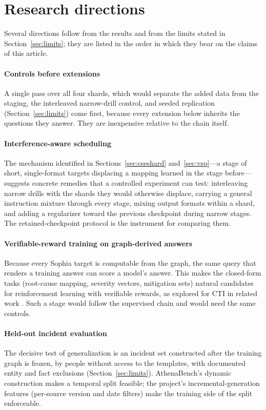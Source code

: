 \documentclass[twocolumn]{svjour3}
\begin{document}
\section{Research directions}\label{sec:directions}
Several directions follow from the results and from the limits stated in Section~\ref{sec:limits}; they are listed in the order in which they bear on the claims of this article.

\paragraph{Controls before extensions}
A single pass over all four shards, which would separate the added data from the staging, the interleaved narrow-drill control, and seeded replication (Section~\ref{sec:limits}) come first, because every extension below inherits the questions they answer. They are inexpensive relative to the chain itself.

\paragraph{Interference-aware scheduling}
The mechanism identified in Sections~\ref{sec:cseshard} and~\ref{sec:vsp}---a stage of short, single-format targets displacing a mapping learned in the stage before---suggests concrete remedies that a controlled experiment can test: interleaving narrow drills with the shards they would otherwise displace, carrying a general instruction mixture through every stage, mixing output formats within a shard, and adding a regularizer toward the previous checkpoint during narrow stages. The retained-checkpoint protocol is the instrument for comparing them.

\paragraph{Verifiable-reward training on graph-derived answers}
Because every Sophia target is computable from the graph, the same query that renders a training answer can score a model's answer. This makes the closed-form tasks (root-cause mapping, severity vectors, mitigation sets) natural candidates for reinforcement learning with verifiable rewards, as explored for CTI in related work \cite{alam2026minerva}. Such a stage would follow the supervised chain and would need the same controls.

\paragraph{Held-out incident evaluation}
The decisive test of generalization is an incident set constructed after the training graph is frozen, by people without access to the templates, with documented entity and fact exclusions (Section~\ref{sec:limits}). AthenaBench's dynamic construction makes a temporal split feasible; the project's incremental-generation features (per-source version and date filters) make the training side of the split enforceable.
\end{document}
